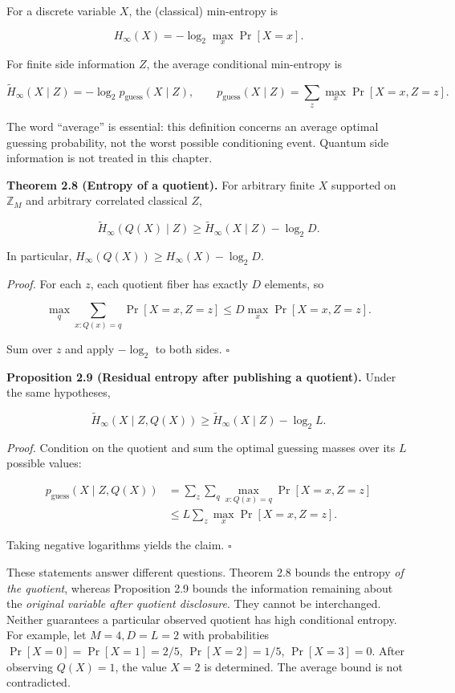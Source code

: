 \documentclass[
  11pt,
  a4paper,
  oneside]{report}
\begin{document}
For a discrete variable \(X\), the (classical) min-entropy is

\[
H_\infty(X)=-\log_2\max_x\Pr[X=x].
\]

For finite side information \(Z\), the average conditional min-entropy
is

\[
\widetilde H_\infty(X\mid Z)
=-\log_2 p_{\mathrm{guess}}(X\mid Z),\qquad
p_{\mathrm{guess}}(X\mid Z)
=\sum_z\max_x\Pr[X=x,Z=z].
\]

The word ``average'' is essential: this definition concerns an average
optimal guessing probability, not the worst possible conditioning event.
Quantum side information is not treated in this chapter.

\textbf{Theorem 2.8 (Entropy of a quotient).} For arbitrary finite \(X\)
supported on \(\mathbb Z_M\) and arbitrary correlated classical \(Z\),

\[
\widetilde H_\infty(Q(X)\mid Z)
\ge\widetilde H_\infty(X\mid Z)-\log_2D.
\]

In particular, \(H_\infty(Q(X))\ge H_\infty(X)-\log_2D\).

\emph{Proof.} For each \(z\), each quotient fiber has exactly \(D\)
elements, so

\[
\max_q\sum_{x:Q(x)=q}\Pr[X=x,Z=z]
\le D\max_x\Pr[X=x,Z=z].
\]

Sum over \(z\) and apply \(-\log_2\) to both sides. \(\square\)

\textbf{Proposition 2.9 (Residual entropy after publishing a quotient).}
Under the same hypotheses,

\[
\widetilde H_\infty(X\mid Z,Q(X))
\ge\widetilde H_\infty(X\mid Z)-\log_2L.
\]

\emph{Proof.} Condition on the quotient and sum the optimal guessing
masses over its \(L\) possible values:

\[
\begin{aligned}
p_{\mathrm{guess}}(X\mid Z,Q(X))
&=\sum_z\sum_q\max_{x:Q(x)=q}\Pr[X=x,Z=z]\\
&\le L\sum_z\max_x\Pr[X=x,Z=z].
\end{aligned}
\]

Taking negative logarithms yields the claim. \(\square\)

These statements answer different questions. Theorem 2.8 bounds the
entropy \emph{of the quotient}, whereas Proposition 2.9 bounds the
information remaining about the \emph{original variable after quotient
disclosure}. They cannot be interchanged. Neither guarantees a
particular observed quotient has high conditional entropy. For example,
let \(M=4,D=L=2\) with probabilities \(\Pr[X=0]=\Pr[X=1]=2/5\),
\(\Pr[X=2]=1/5\), \(\Pr[X=3]=0\). After observing \(Q(X)=1\), the value
\(X=2\) is determined. The average bound is not contradicted.
\end{document}
